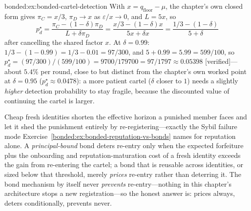 \begin{pdSolution}{bonded:ex:bonded-cartel-detection}
With $x = q_{\mathrm{floor}} - \mu$, the chapter's own closed form gives $\pi_C = x/3$, $\pi_D \to x$ as $\varepsilon/x\to0$, and $L=5x$, so
\[
p_d^\star=\frac{\pi_C-(1-\delta)\pi_D}{L+\delta\pi_D} = \frac{x/3-(1-\delta)x}{5x+\delta x} = \frac{1/3-(1-\delta)}{5+\delta}
\]
after cancelling the shared factor $x$. At $\delta=0.99$: $1/3-(1-0.99)=1/3-0.01=97/300$, and $5+0.99=5.99=599/100$, so $p_d^\star = (97/300)/(599/100) = 9700/179700 = 97/1797 \approx 0.05398$ [verified]---about $5.4\%$ per round, close to but distinct from the chapter's own worked point at $\delta=0.95$ ($p_d^\star\approx0.0478$): a more patient cartel ($\delta$ closer to $1$) needs a slightly \emph{higher} detection probability to stay fragile, because the discounted value of continuing the cartel is larger.

Cheap fresh identities shorten the effective horizon a punished member faces and let it shed the punishment entirely by re-registering---exactly the Sybil failure mode Exercise~\ref{bonded:ex:bonded-reputation-vs-bonds} names for reputation alone. A \emph{principal-bound} bond deters re-entry only when the expected forfeiture plus the onboarding and reputation-maturation cost of a fresh identity exceeds the gain from re-entering the cartel; a bond that is reusable across identities, or sized below that threshold, merely \emph{prices} re-entry rather than deterring it. The bond mechanism by itself never \emph{prevents} re-entry---nothing in this chapter's architecture stops a new registration---so the honest answer is: prices always, deters conditionally, prevents never.
\end{pdSolution}
